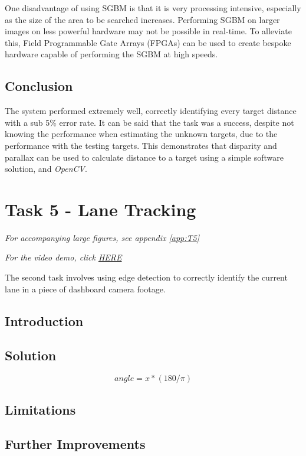 \documentclass[conference]{IEEEtran}
\begin{document}
One disadvantage of using SGBM is that it is very processing intensive, especially as the size of the area to be searched increases. Performing SGBM on larger images on less powerful hardware may not be possible in real-time. To alleviate this, Field Programmable Gate Arrays (FPGAs) can be used to create bespoke hardware capable of performing the SGBM at high speeds\cite{Hardware_SGBM}.
\subsection{Conclusion}
The system performed extremely well, correctly identifying every target distance with a sub 5\% error rate. It can be said that the task was a success, despite not knowing the performance when estimating the unknown targets, due to the performance with the testing targets. This demonstrates that disparity and parallax can be used to calculate distance to a target using a simple software solution, and \textit{OpenCV}. 

\section{Task 5 - Lane Tracking}
\textit{For accompanying large figures, see appendix \ref{app:T5}}

\textit{For the video demo, click \href{https://youtu.be/kW5fbNTTovo}{HERE}}

The second task involves using edge detection to correctly identify the current lane in a piece of dashboard camera footage. 
\subsection{Introduction}

\subsection{Solution}\label{2_solution}

\begin{equation}
angle = x*(180/\pi )
\end{equation}


\subsection{Limitations}\label{sec:t2_lim}

\subsection{Further Improvements}
\end{document}
